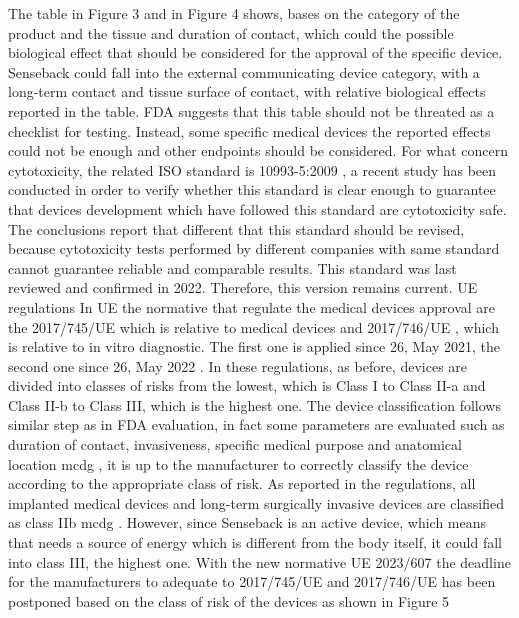 \documentclass{Configuration_Files/PoliMi3i_thesis}
\begin{document}
The table in Figure 3 and in Figure 4 shows, bases on the category of the product and the tissue and duration of contact, which could the possible biological effect that should be considered for the approval of the specific device.
Senseback could fall into the external communicating device category, with a long-term contact and tissue surface of contact, with relative biological effects reported in the table.  
FDA suggests that this table should not be threated as a checklist for testing. Instead, some specific medical devices the reported effects could not be enough and other endpoints should be considered.
For what concern cytotoxicity, the related ISO standard is 10993-5:2009 \cite{14:00-17:00ISO1099352009a}, a recent study \cite{gruberToxicNotToxic2023} has been conducted in order to verify whether this standard is clear enough to guarantee that devices development which have followed this standard are cytotoxicity safe. The conclusions report that different that this standard should be revised, because cytotoxicity tests performed by different companies with same standard cannot guarantee reliable and comparable results. This standard was last reviewed and confirmed in 2022. Therefore, this version remains current. 
UE regulations
In UE the normative that regulate the medical devices approval are the 2017/745/UE \cite{RegolamentoUE20172017} which is relative to medical devices and 2017/746/UE \cite{RegolamentoUE20172017a}, which is relative to in vitro diagnostic. The first one is applied since 26, May 2021, the second one since 26, May 2022 \cite{MedicalDevicesEuropean}. 
In these regulations, as before, devices are divided into classes of risks from the lowest, which is Class I to Class II-a and Class II-b to Class III, which is the highest one. The device classification follows similar step as in FDA evaluation, in fact some parameters are evaluated such as duration of contact, invasiveness, specific medical purpose and anatomical location \cite{PublicHealthEuropean2024} mcdg , it is up to the manufacturer to correctly classify the device according to the appropriate class of risk.
As reported in the regulations, all implanted medical devices and long-term surgically invasive devices are classified as class IIb \cite{PublicHealthEuropean2024} mcdg . However, since Senseback is an active device, which means that needs a source of energy which is different from the body itself, it could fall into class III, the highest one.
With the new normative UE 2023/607 \cite{RegolamentoUE20232023} the deadline for the manufacturers to adequate to 2017/745/UE and 2017/746/UE has been postponed based on the class of risk of the devices as shown in Figure 5
\end{document}
